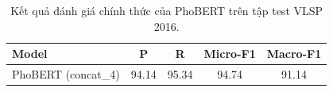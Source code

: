 \begin{table}[t]
\centering
\begin{tabular}{lcccc}
\hline
\textbf{Model} & \textbf{P} & \textbf{R} & \textbf{Micro-F1} & \textbf{Macro-F1} \\
\hline
PhoBERT (concat_4) & 94.14 & 95.34 & 94.74 & 91.14 \\
\hline
\end{tabular}
\caption{Kết quả đánh giá chính thức của PhoBERT trên tập test VLSP 2016.}
\label{tab:main}
\end{table}